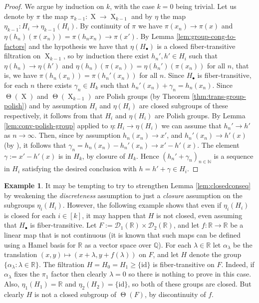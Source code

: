 \documentclass[a4paper,12pt,reqno]{amsart}
\theoremstyle{definition}
\newtheorem{example}[theorem]{Example}
\def\to{\rightarrow}
\newcommand{\mc}{\mathcal}
\newcommand{\mb}{\mathbb}
\newcommand{\id}{\mathrm{id}}
\DeclareMathOperator{\tran}{\Theta}
\DeclareMathOperator{\ns}{X}
\begin{document}
\begin{proof}
We argue by induction on $k$, with the case $k=0$ being trivial. Let us denote by $\pi$ the map $\pi_{k-1}:\ns\to\ns_{k-1}$ and by $\eta$ the map $\eta_{k-1}:H_i\to \eta_{k-1}(H_i)$. By continuity of $\pi$ we have $\pi(x_n)\to \pi(x)$ and $\eta(h_n)(\pi(x_n))=\pi(h_nx_n)\to  \pi(x')$. By Lemma \ref{lem:group-cong-to-factors} and the hypothesis we have that  $\eta(H_\bullet)$ is a closed fiber-transitive filtration on $\ns_{k-1}$, so by induction there exist $h_n', h'\in H_i$ such that $\eta(h_n)\to \eta(h')$ and $\eta(h_n)(\pi(x_n))=\eta(h_n')(\pi(x_n))$ for all $n$, that is, we have $\pi(h_n(x_n))=\pi(h_n'(x_n))$ for all $n$. Since $H_\bullet$ is fiber-transitive, for each $n$ there exists $\gamma_n\in H_k$ such that $h_n'(x_n)+\gamma_n=h_n(x_n)$. Since $\tran(\ns)$ and $\tran(\ns_{k-1})$ are Polish groups (by Theorem \ref{thm:trans-group-polish}) and by assumption $H_i$ and $\eta(H_i)$ are closed subgroups of these respectively, it follows from \cite[Proposition 1.2.1]{BeKe} that $H_i$ and $\eta(H_i)$ are Polish groups. By Lemma \ref{lem:conv-polish-group} applied to $\eta:H_i\to \eta(H_i)$ we can assume that $h_n'\to h'$ as $n\to\infty$. Then, since by assumption $h_n(x_n)\to x'$, and  $h_n'(x_n)\to h'(x)$ (by  \cite[Theorem 46.10]{Mu}), it follows that $\gamma_n=h_n(x_n)-h_n'(x_n)\to x'-h'(x)$. The element $\gamma:=x'-h'(x)$ is in $H_k$, by closure of $H_k$. Hence $(h_n'+\gamma_n)_{n\in \mb{N}}$ is a sequence in $H_i$ satisfying the desired conclusion with $h=h'+\gamma\in H_i$.
\end{proof}
\begin{example}
It may be tempting to try to strengthen Lemma \ref{lem:closedconseq} by weakening the \emph{discreteness} assumption to just a \emph{closure} assumption on the subgroups $\eta_i(H_i)$. However, the following example shows that even if $\eta_i(H_i)$ is closed for each $i\in [k]$, it may happen that $H$ is not closed, even assuming that $H_\bullet$ is fiber-transitive. Let $F:=\mc{D}_1(\mb{R})\times \mc{D}_2(\mb{R})$, and let $f:\mb{R}\to \mb{R}$ be a linear map that is not continuous (it is known that such maps can be defined using a Hamel basis for $\mb{R}$ as a vector space over $\mb{Q}$). For each $\lambda\in \mb{R}$ let $\alpha_\lambda$ be the translation  $(x,y)\mapsto (x+\lambda,y+f(\lambda))$ on $F$, and let $H$ denote the group $\{\alpha_\lambda:\lambda\in\mb{R}\}$. The filtration $H=H_0=H_1\ge \{\id\}$ is fiber-transitive on $F$. Indeed, if $\alpha_\lambda$ fixes the $\pi_1$ factor then clearly $\lambda=0$ so there is nothing to prove in this case. Also, $\eta_1(H_1)=\mb{R}$ and $\eta_2(H_2)=\{\id\}$, so both of these groups are closed. But clearly $H$ is not a closed subgroup of $\tran(F)$, by discontinuity of $f$.
\end{example}
\end{document}
